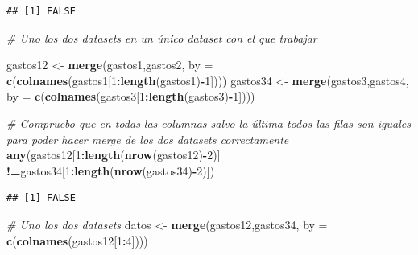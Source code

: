 \documentclass[notspecified,article,submit,moreauthors,pdftex]{Definitions/mdpi}
\newenvironment{Shaded}{\begin{snugshade}}{\end{snugshade}}
\newcommand{\AttributeTok}[1]{\textcolor[rgb]{0.13,0.29,0.53}{#1}}
\newcommand{\CommentTok}[1]{\textcolor[rgb]{0.56,0.35,0.01}{\textit{#1}}}
\newcommand{\DecValTok}[1]{\textcolor[rgb]{0.00,0.00,0.81}{#1}}
\newcommand{\FunctionTok}[1]{\textcolor[rgb]{0.13,0.29,0.53}{\textbf{#1}}}
\newcommand{\NormalTok}[1]{#1}
\newcommand{\OtherTok}[1]{\textcolor[rgb]{0.56,0.35,0.01}{#1}}
\newcommand{\SpecialCharTok}[1]{\textcolor[rgb]{0.81,0.36,0.00}{\textbf{#1}}}
\begin{document}
\begin{verbatim}
## [1] FALSE
\end{verbatim}

\begin{Shaded}
\begin{Highlighting}[]
\CommentTok{\# Uno los dos datasets en un único dataset con el que trabajar}

\NormalTok{gastos12 }\OtherTok{\textless{}{-}} \FunctionTok{merge}\NormalTok{(gastos1,gastos2, }\AttributeTok{by =} \FunctionTok{c}\NormalTok{(}\FunctionTok{colnames}\NormalTok{(gastos1[}\DecValTok{1}\SpecialCharTok{:}\FunctionTok{length}\NormalTok{(gastos1)}\SpecialCharTok{{-}}\DecValTok{1}\NormalTok{])))}
\NormalTok{gastos34 }\OtherTok{\textless{}{-}} \FunctionTok{merge}\NormalTok{(gastos3,gastos4, }\AttributeTok{by =} \FunctionTok{c}\NormalTok{(}\FunctionTok{colnames}\NormalTok{(gastos3[}\DecValTok{1}\SpecialCharTok{:}\FunctionTok{length}\NormalTok{(gastos3)}\SpecialCharTok{{-}}\DecValTok{1}\NormalTok{])))}
\end{Highlighting}
\end{Shaded}

\begin{Shaded}
\begin{Highlighting}[]
\CommentTok{\# Compruebo que en todas las columnas salvo la última todos las filas son iguales para poder hacer merge de los dos datasets correctamente}
\FunctionTok{any}\NormalTok{(gastos12[}\DecValTok{1}\SpecialCharTok{:}\FunctionTok{length}\NormalTok{(}\FunctionTok{nrow}\NormalTok{(gastos12)}\SpecialCharTok{{-}}\DecValTok{2}\NormalTok{)] }\SpecialCharTok{!=}\NormalTok{gastos34[}\DecValTok{1}\SpecialCharTok{:}\FunctionTok{length}\NormalTok{(}\FunctionTok{nrow}\NormalTok{(gastos34)}\SpecialCharTok{{-}}\DecValTok{2}\NormalTok{)])}
\end{Highlighting}
\end{Shaded}

\begin{verbatim}
## [1] FALSE
\end{verbatim}

\begin{Shaded}
\begin{Highlighting}[]
\CommentTok{\# Uno los dos datasets}
\NormalTok{datos }\OtherTok{\textless{}{-}} \FunctionTok{merge}\NormalTok{(gastos12,gastos34, }\AttributeTok{by =} \FunctionTok{c}\NormalTok{(}\FunctionTok{colnames}\NormalTok{(gastos12[}\DecValTok{1}\SpecialCharTok{:}\DecValTok{4}\NormalTok{])))}
\end{Highlighting}
\end{Shaded}
\end{document}
